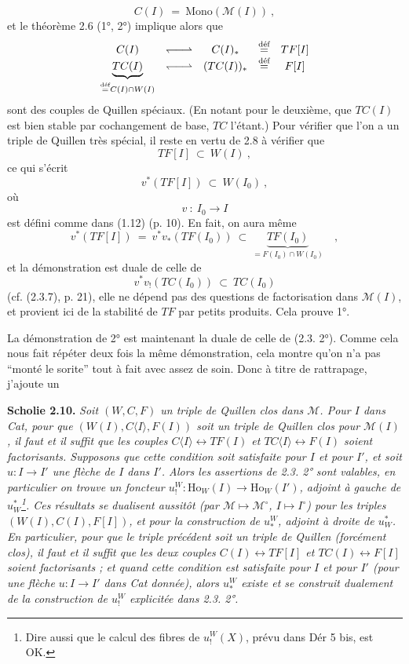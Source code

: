 \documentclass[11pt]{article}
\newcommand{\printedpage}[1]{\marginpar{\footnotesize p.~#1}}
\newcommand{\msp}[1]{\marginpar{\footnotesize [#1]}}
\newcommand{\M}{\mathcal{M}}
\newcommand{\Ho}{\mathrm{Ho}}
\newcommand{\deq}{\overset{\text{déf}}{=}}
\newcommand{\Mono}{\mathrm{Mono}}
\newcommand{\qpair}{\mathrel{\leftharpoondown\joinrel\relbar\joinrel\rightharpoonup}}
\begin{document}
\[ C(I) \ = \ \Mono(\mathcal{M}(I))\ , \]
et le théorème 2.6 (1°, 2°) implique alors que
\[ \begin{array}{ccccc}
C(I) & \qpair & C(I)_* & \deq & TF[I]\\
\underbrace{TC(I)}_{\deq C(I)\cap W(I)} & \qpair & (TC(I))_* & \deq & F[I]
\end{array} \] %
sont des couples de Quillen spéciaux. (En notant pour le deuxième, que $TC(I)$ est bien \msp{page 30} stable par cochangement de base, $TC$ l'étant.) Pour vérifier que l'on a un triple de Quillen très spécial, il reste en vertu de 2.8 à vérifier que
\[ TF[I] \ \subset\ W(I)\ , \]
ce qui s'écrit
\[ v^*(TF[I]) \ \subset\ W(I_0)\ , \]
où
\[ v \ :\ I_0 \longrightarrow I \]
est défini comme dans (1.12) (p. 10). En fait, on aura même
\[ v^*(TF[I]) \ = \ v^*v_*(TF(I_0)) \ \subset\ \underbrace{TF(I_0)}_{= F(I_0)\cap W(I_0)}\quad , \]
et la démonstration est duale de celle de
\[ v^*v_!(TC(I_0)) \ \subset\ TC(I_0) \]
(cf. (2.3.7), p. 21), elle ne dépend pas des questions de factorisation dans $\mathcal{M}(I)$, et provient ici de la stabilité de $TF$ par petits produits. Cela prouve 1°.

La démonstration de 2° est maintenant la duale de celle de (2.3. 2°). Comme cela nous fait répéter deux fois la même démonstration, cela montre qu'on n'a pas “monté le sorite” tout à fait avec assez de soin. Donc à titre de rattrapage, j'ajoute un

\printedpage{19}

\msp{page 31}
\textbf{Scholie 2.10.} \textit{Soit $(W,C,F)$ un triple de Quillen clos dans $\M$. Pour $I$ dans \textup{Cat}, pour que $(W(I),C\langle I\rangle,F(I))$ soit un triple de Quillen clos pour $\M(I)$, il faut et il suffit que les couples $C\langle I\rangle\longleftrightarrow TF(I)$ et $TC\langle I\rangle\longleftrightarrow F(I)$ soient factorisants. Supposons que cette condition soit satisfaite pour $I$ et pour $I'$, et soit $u : I\longrightarrow I'$ une flèche de $I$ dans $I'$. Alors les assertions de \textup{2.3. 2°} sont valables, en particulier on trouve un foncteur $u^{W}_{!} : \Ho_W(I)\longrightarrow\Ho_W(I')$, adjoint à gauche de $u^{*}_{W}$\footnote[18]{Dire aussi que le calcul des fibres de $u^{W}_{!}(X)$, prévu dans Dér 5 bis, est OK.}. Ces résultats se dualisent aussitôt (par $\M\longmapsto\M^{\circ}$, $I\longmapsto I^{\circ}$) pour les triples $(W(I),C(I),F[I])$, et pour la construction de $u^{W}_{*}$, adjoint à droite de $u^{*}_{W}$. En particulier, pour que le triple précédent soit un triple de Quillen (forcément clos), il faut et il suffit que les deux couples $C(I)\longleftrightarrow TF[I]$ et $TC(I)\longleftrightarrow F[I]$ soient factorisants ; et quand cette condition est satisfaite pour $I$ et pour $I'$ (pour une flèche $u : I\longrightarrow I'$ dans \textup{Cat} donnée), alors $u^{W}_{*}$ existe et se construit dualement de la construction de $u^{W}_{!}$ explicitée dans \textup{2.3. 2°}.}
\end{document}
